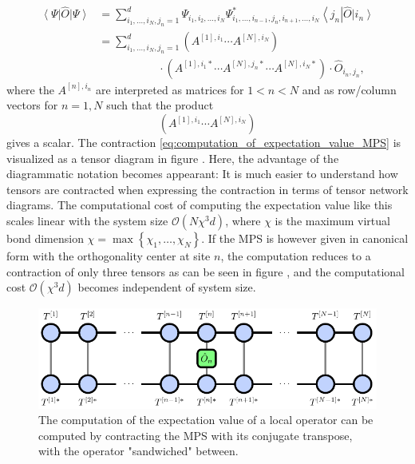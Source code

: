 \begin{equation}
\begin{split}
	\label{eq:computation_of_expectation_value_MPS}
	\left\langle\Psi\right|\hat{O}\left|\Psi\right\rangle &=\sum_{i_1,\dots,i_N,j_n=1}^{d}\Psi_{i_1,i_2,\dots,i_N} \Psi_{i_1,\dots,i_{n-1},j_n,i_{n+1},\dots,i_N}^* \left\langle j_n\right|\hat{O} \left|i_n\right\rangle \\
	&= \sum_{i_1,\dots,i_N,j_n=1}^{d} \left(A^{[1],i_1}\cdots A^{[N],i_N}\right) \\
	&\quad\quad\quad\quad\quad\,\,\cdot\left(A^{[1],i_1*}\cdots A^{[N],j_n*} \cdots A^{[N],i_N*}\right)\cdot \hat{O}_{i_n,j_n},
\end{split}
\end{equation}
where the $A^{[n],i_n}$ are interpreted as matrices for $1 < n < N$ and as row/column vectors for $n = 1, N$ such that the product
\begin{equation}
	\left(A^{[1],i_1}\cdots A^{[N],i_N}\right)
\end{equation}
gives a scalar. The contraction \eqref{eq:computation_of_expectation_value_MPS} is visualized as a tensor diagram in figure . Here, the advantage of the diagrammatic notation becomes appearant: It is much easier to understand how tensors are contracted when expressing the contraction in terms of tensor network diagrams. The computational cost of computing the expectation value like this scales linear with the system size $\mathcal{O}\left(N\chi^3d\right)$, where $\chi$ is the maximum virtual bond dimension $\chi = \max\left\{\chi_1,\dots,\chi_N\right\}$. If the MPS is however given in canonical form with the orthogonality center at site $n$, the computation reduces to a contraction of only three tensors as can be seen in figure , and the computational cost $\mathcal{O}\left(\chi^3d\right)$ becomes independent of system size. \par
\begin{figure}
	\centering
	\includegraphics[scale=1]{figures/tikz/Tensor_Networks/mps_local_expectation_value/mps_local_expectation_value.pdf}
	\caption{The computation of the expectation value of a local operator can be computed by contracting the MPS with its conjugate transpose, with the operator "sandwiched" between.}
	\label{fig:mps_local_expectation_value}
\end{figure}
